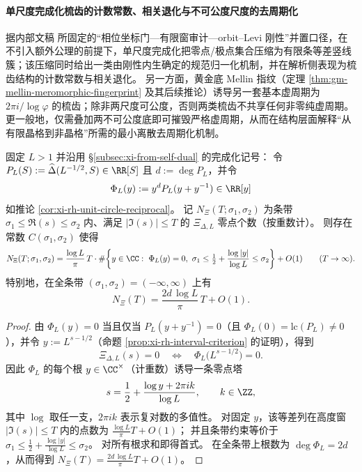 \paragraph{单尺度完成化梳齿的计数常数、相关退化与不可公度尺度的去周期化}
据内部文稿 \cite{Internal2025ResolutionFoldingPhiPi} 所固定的“相位坐标门—有限窗审计—orbit–Levi 刚性”并置口径，在不引入额外公理的前提下，单尺度完成化把零点/极点集合压缩为有限条等差竖线簇；该压缩同时给出一类由刚性内生确定的规范归一化机制，并在解析侧表现为梳齿结构的计数常数与相关退化。
另一方面，黄金底 Mellin 指纹（定理 \ref{thm:gm-mellin-meromorphic-fingerprint} 及其后续推论）诱导另一套基本虚周期为 \(2\pi i/\log\varphi\) 的梳齿；除非两尺度可公度，否则两类梳齿不共享任何非零纯虚周期。更一般地，仅需叠加两不可公度底即可摧毁严格虚周期，从而在结构层面解释“从有限晶格到非晶格”所需的最小离散去周期化机制。

\begin{proposition}\label{prop:xi-single-scale-completed-zero-count-leading-constant}
固定 \(L>1\) 并沿用 \S\ref{subsec:xi-from-self-dual} 的完成化记号：
令
\(
P_L(S):=\widehat\Delta(L^{-1/2},S)\in\RR[S]
\)
且 \(d:=\deg P_L\)，并令
\[
\Phi_L(y):=y^{d}P_L(y+y^{-1})\in\RR[y]
\]
如推论 \ref{cor:xi-rh-unit-circle-reciprocal}。
记 \(N_{\Xi}(T;\sigma_1,\sigma_2)\) 为条带 \(\sigma_1\le \Re(s)\le \sigma_2\) 内、满足 \(|\Im(s)|\le T\) 的 \(\Xi_{\Delta,L}\) 零点个数（按重数计）。
则存在常数 \(C(\sigma_1,\sigma_2)\) 使得
\[
N_{\Xi}(T;\sigma_1,\sigma_2)
=\frac{\log L}{\pi}\,T\cdot
\#\!\left\{
y\in\CC:\ \Phi_L(y)=0,\ 
\sigma_1\le \tfrac12+\frac{\log|y|}{\log L}\le \sigma_2
\right\}
+O(1)\qquad(T\to\infty).
\]
特别地，在全条带 \((\sigma_1,\sigma_2)=(-\infty,\infty)\) 上有
\[
N_{\Xi}(T)
=\frac{2d\,\log L}{\pi}\,T+O(1).
\]
\end{proposition}

\begin{proof}
由 \(\Phi_L(y)=0\) 当且仅当 \(P_L(y+y^{-1})=0\)（且 \(\Phi_L(0)=\mathrm{lc}(P_L)\neq 0\)），并令 \(y:=L^{s-1/2}\)（命题 \ref{prop:xi-rh-interval-criterion} 的证明），得到
\[
\Xi_{\Delta,L}(s)=0\quad\Longleftrightarrow\quad \Phi_L\!\bigl(L^{s-1/2}\bigr)=0.
\]
因此 \(\Phi_L\) 的每个根 \(y\in\CC^\times\)（计重数）诱导一条零点塔
\[
s=\frac12+\frac{\log y+2\pi i k}{\log L},\qquad k\in\ZZ,
\]
其中 \(\log\) 取任一支，\(2\pi i k\) 表示复对数的多值性。
对固定 \(y\)，该等差列在高度窗 \(|\Im(s)|\le T\) 内的点数为 \(\frac{\log L}{\pi}T+O(1)\)；
并且条带约束等价于
\(
\sigma_1\le \frac12+\frac{\log|y|}{\log L}\le \sigma_2
\)。
对所有根求和即得首式。
在全条带上根数为 \(\deg\Phi_L=2d\)，从而得到
\(
N_{\Xi}(T)=\frac{2d\,\log L}{\pi}T+O(1)
\)。
\end{proof}

